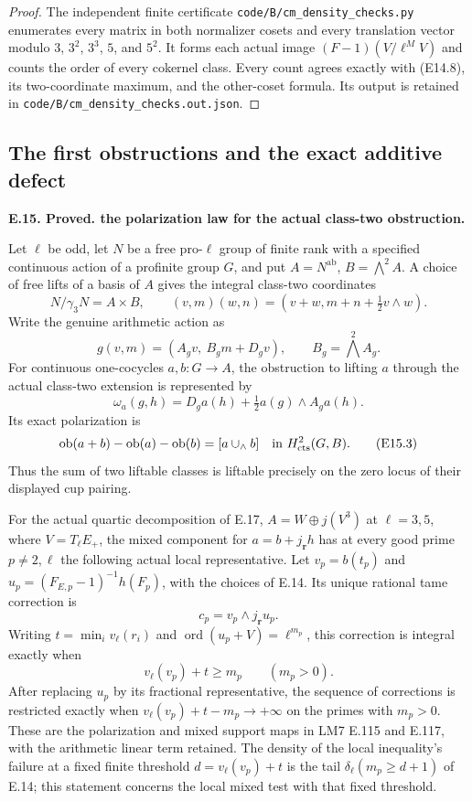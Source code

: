 \documentclass[11pt,oneside]{article}
\makeatletter
\newcounter{statementanchor}
\newenvironment{statement}[3]{%
 \refstepcounter{statementanchor}\def\@currentlabel{#1}%
 \par\addvspace{9pt}\noindent
 \textbf{#1. #2. #3.}\par\nobreak\noindent\ignorespaces
}{\par\addvspace{5pt}}
\makeatother
\begin{document}
\begin{proof}
The independent finite certificate
\texttt{code/B/cm\_density\_checks.py} enumerates every matrix
in both normalizer cosets and every translation vector modulo
$3$, $3^2$, $3^3$, $5$, and $5^2$.  It forms each actual image
$(F-1)(V/\ell^M V)$ and counts the order of every cokernel
class.  Every count agrees exactly with (E14.8), its
two-coordinate maximum, and the other-coset formula.  Its
output is retained in
\texttt{code/B/cm\_density\_checks.out.json}.
\end{proof}

\subsection{The first obstructions and the exact additive defect}

\begin{statement}{E.15}{Proved}{the polarization law for the actual class-two obstruction}
\label{st:E.15}
\label{E-polarization}
Let $\ell$ be odd, let $N$ be a free pro-$\ell$ group of
finite rank with a specified continuous action of a
profinite group $G$, and put
$A=N^{\mathrm{ab}}$, $B=\bigwedge^2 A$.
A choice of free lifts of a basis of $A$ gives the integral
class-two coordinates
\[
 N/\gamma_3N=A\times B,\qquad
 (v,m)(w,n)=(v+w,m+n+\tfrac12v\wedge w).
 \tag{E15.1}
\]
Write the genuine arithmetic action as
\[
 g(v,m)=(A_gv,\ B_gm+D_gv),\qquad
 B_g=\bigwedge^2 A_g.
\]
For continuous one-cocycles $a,b:G\to A$, the obstruction
to lifting $a$ through the actual class-two extension is
represented by
\[
 \omega_a(g,h)=D_g a(h)+\tfrac12a(g)\wedge A_g a(h).
 \tag{E15.2}
\]
Its exact polarization is
\[
 \operatorname{ob}(a+b)-\operatorname{ob}(a)
       -\operatorname{ob}(b)=[a\cup_{\wedge}b]
       \quad\text{in }H^2_{\rm cts}(G,B).
 \tag{E15.3}
\]
Thus the sum of two liftable classes is liftable precisely
on the zero locus of their displayed cup pairing.

For the actual quartic decomposition of E.17,
$A=W\oplus j(V^3)$ at
$\ell=3,5$, where $V=T_\ell E_+$, the mixed component
for $a=b+j_{\mathbf r}h$ has at every good prime
$p\ne2,\ell$ the following actual local representative.
Let $v_p=b(t_p)$ and
$u_p=(F_{E,p}-1)^{-1}h(F_p)$, with the choices of E.14.
Its unique rational tame correction is
\[
 c_p=v_p\wedge j_{\mathbf r}u_p .
 \tag{E15.4}
\]
Writing $t=\min_i v_\ell(r_i)$ and
$\operatorname{ord}(u_p+V)=\ell^{m_p}$, this correction
is integral exactly when
\[
 v_\ell(v_p)+t\ge m_p\qquad(m_p>0).
 \tag{E15.5}
\]
After replacing $u_p$ by its fractional representative,
the sequence of corrections is restricted exactly when
$v_\ell(v_p)+t-m_p\to+\infty$ on the primes with $m_p>0$.
These are the polarization and mixed support maps in
LM7 E.115 and E.117, with the arithmetic linear term
retained. The density of the local inequality's failure
at a fixed finite threshold $d=v_\ell(v_p)+t$ is the
tail $\delta_\ell(m_p\ge d+1)$ of E.14; this statement
concerns the local mixed test with that fixed threshold.
\end{statement}
\end{document}
